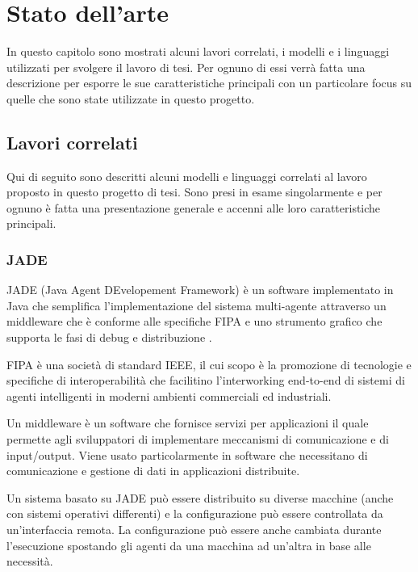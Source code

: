 \chapter{Stato dell'arte}
\lhead[\fancyplain{}{\bfseries\thepage}]{\fancyplain{}{\bfseries\rightmark}}

In questo capitolo sono mostrati alcuni lavori correlati, i modelli e i linguaggi utilizzati per svolgere il lavoro di tesi. Per ognuno di essi verrà fatta una descrizione per esporre le sue caratteristiche principali con un particolare focus su quelle che sono state utilizzate in questo progetto.

\section{Lavori correlati}
Qui di seguito sono descritti alcuni modelli e linguaggi correlati al lavoro proposto in questo progetto di tesi. Sono presi in esame singolarmente e per ognuno è fatta una presentazione generale e accenni alle loro caratteristiche principali.

\subsection*{JADE}
JADE (Java Agent DEvelopement Framework) è un software implementato in Java che semplifica l'implementazione del sistema multi-agente attraverso un middleware che è conforme alle specifiche FIPA e uno strumento grafico che supporta le fasi di debug e distribuzione \cite{JADE}.

FIPA è una società di standard IEEE, il cui scopo è la promozione di tecnologie e specifiche di interoperabilità che facilitino l'interworking end-to-end di sistemi di agenti intelligenti in moderni ambienti commerciali ed industriali.

Un middleware è un software che fornisce servizi per applicazioni il quale permette agli sviluppatori di implementare meccanismi di comunicazione e di input/output. Viene usato particolarmente in software che necessitano di comunicazione e gestione di dati in applicazioni distribuite.

Un sistema basato su JADE può essere distribuito su diverse macchine (anche con sistemi operativi differenti) e la configurazione può essere controllata da un'interfaccia remota. La configurazione può essere anche cambiata durante l'esecuzione spostando gli agenti da una macchina ad un'altra in base alle necessità.

